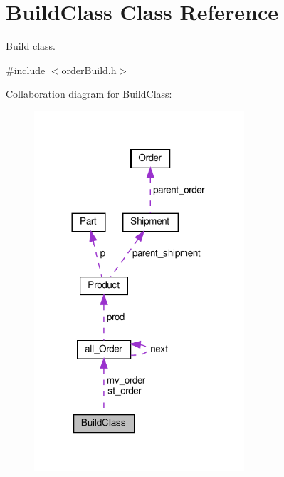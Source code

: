 \hypertarget{classBuildClass}{}\section{Build\+Class Class Reference}
\label{classBuildClass}


Build class.  




{\ttfamily \#include $<$order\+Build.\+h$>$}



Collaboration diagram for Build\+Class\+:
\nopagebreak
\begin{figure}[H]
\begin{center}
\leavevmode
\includegraphics[width=221pt]{classBuildClass__coll__graph}
\end{center}
\end{figure}
